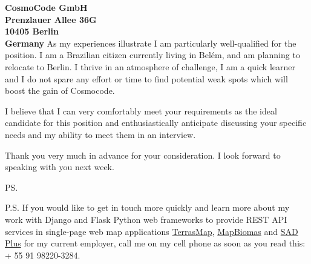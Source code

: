 \documentclass[a4paper]{joaosoares-letter}
\begin{document}
\begin{letter}{\bfseries CosmoCode GmbH\\Prenzlauer Allee 36G\\10405 Berlin\\Germany}
As my experiences illustrate I am particularly well-qualified for the position. I am a Brazilian citizen currently living in Belém, and am planning to relocate to Berlin. I thrive in an atmosphere of challenge, I am a quick learner and I do not spare any effort or time to find potential weak spots which will boost the gain of Cosmocode.

I believe that I can very comfortably meet your requirements as the ideal candidate for this position and enthusiastically anticipate discussing your specific needs and my ability to meet them in an interview.

\closing{Thank you very much in advance for your consideration. I look forward to speaking with you next week.}
\vspace{10pt}
\ps

P.S. If you would like to get in touch more quickly and learn more about my work with Django and Flask Python web frameworks to provide REST API services in single-page web map applications \href{https://goo.gl/6gUzPA}{TerrasMap}, \href{https://goo.gl/eYX5SW}{MapBiomas} and \href{https://goo.gl/2J41hR}{SAD Plus} for my current employer, call me on my cell phone as soon as you read this: + 55 91 98220-3284.
\vspace{\fill}

\end{letter}
\end{document}
